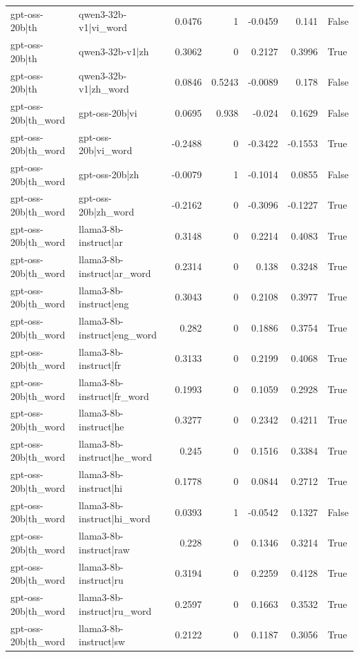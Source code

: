 \begin{table}
\begin{tabular}{l l r r r r l}
gpt-oss-20b|th & qwen3-32b-v1|vi_word & 0.0476 & 1 & -0.0459 & 0.141 & False \\
gpt-oss-20b|th & qwen3-32b-v1|zh & 0.3062 & 0 & 0.2127 & 0.3996 & True \\
gpt-oss-20b|th & qwen3-32b-v1|zh_word & 0.0846 & 0.5243 & -0.0089 & 0.178 & False \\
gpt-oss-20b|th_word & gpt-oss-20b|vi & 0.0695 & 0.938 & -0.024 & 0.1629 & False \\
gpt-oss-20b|th_word & gpt-oss-20b|vi_word & -0.2488 & 0 & -0.3422 & -0.1553 & True \\
gpt-oss-20b|th_word & gpt-oss-20b|zh & -0.0079 & 1 & -0.1014 & 0.0855 & False \\
gpt-oss-20b|th_word & gpt-oss-20b|zh_word & -0.2162 & 0 & -0.3096 & -0.1227 & True \\
gpt-oss-20b|th_word & llama3-8b-instruct|ar & 0.3148 & 0 & 0.2214 & 0.4083 & True \\
gpt-oss-20b|th_word & llama3-8b-instruct|ar_word & 0.2314 & 0 & 0.138 & 0.3248 & True \\
gpt-oss-20b|th_word & llama3-8b-instruct|eng & 0.3043 & 0 & 0.2108 & 0.3977 & True \\
gpt-oss-20b|th_word & llama3-8b-instruct|eng_word & 0.282 & 0 & 0.1886 & 0.3754 & True \\
gpt-oss-20b|th_word & llama3-8b-instruct|fr & 0.3133 & 0 & 0.2199 & 0.4068 & True \\
gpt-oss-20b|th_word & llama3-8b-instruct|fr_word & 0.1993 & 0 & 0.1059 & 0.2928 & True \\
gpt-oss-20b|th_word & llama3-8b-instruct|he & 0.3277 & 0 & 0.2342 & 0.4211 & True \\
gpt-oss-20b|th_word & llama3-8b-instruct|he_word & 0.245 & 0 & 0.1516 & 0.3384 & True \\
gpt-oss-20b|th_word & llama3-8b-instruct|hi & 0.1778 & 0 & 0.0844 & 0.2712 & True \\
gpt-oss-20b|th_word & llama3-8b-instruct|hi_word & 0.0393 & 1 & -0.0542 & 0.1327 & False \\
gpt-oss-20b|th_word & llama3-8b-instruct|raw & 0.228 & 0 & 0.1346 & 0.3214 & True \\
gpt-oss-20b|th_word & llama3-8b-instruct|ru & 0.3194 & 0 & 0.2259 & 0.4128 & True \\
gpt-oss-20b|th_word & llama3-8b-instruct|ru_word & 0.2597 & 0 & 0.1663 & 0.3532 & True \\
gpt-oss-20b|th_word & llama3-8b-instruct|sw & 0.2122 & 0 & 0.1187 & 0.3056 & True \\

\end{tabular}
\end{table}
